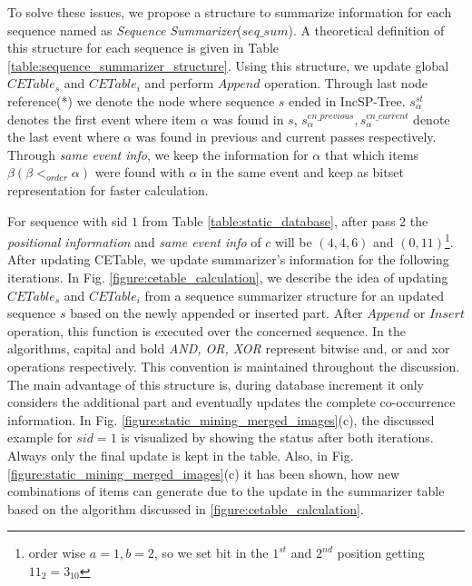 To solve these issues, we propose a structure to summarize information for each sequence named as \textit{Sequence Summarizer}($seq\_sum$). A theoretical definition of this structure for each sequence is given in Table \ref{table:sequence_summarizer_structure}. Using this structure, we update global $CETable_{s}$ and $CETable_{i}$ and perform $Append$ operation. Through last node reference(*) we denote the node where sequence $s$ ended in IncSP-Tree. $s_{\alpha}^{st}$ denotes the first event where item $\alpha$ was found in $s$, $s_{\alpha}^{en\_previous},s_{\alpha}^{en\_current}$ denote the last event where $\alpha$ was found in previous and current passes respectively. Through \textit{same event info}, we keep the information for $\alpha$ that which items $\beta(\beta <_{order} \alpha)$ were found with $\alpha$ in the same event and keep as bitset representation for faster calculation.

For sequence with sid $1$ from Table \ref{table:static_database}, after pass 2 the \textit{positional information} and \textit{same event info} of $c$ will be $(4,4,6)$ and $(0,11)$\footnote{order wise $a=1,b=2$, so we set bit in the $1^{st}$ and $2^{nd}$ position getting $11_{2}=3_{10}$}. After updating CETable, we update summarizer's information for the following iterations. In Fig. \ref{figure:cetable_calculation}, we describe the idea of updating $CETable_{s}$ and $CETable_{i}$ from a sequence summarizer structure for an updated sequence $s$ based on the newly appended or inserted part. After $Append$ or $Insert$ operation, this function is executed over the concerned sequence. In the algorithms, capital and bold \textit{AND, OR, XOR} represent bitwise and, or and xor operations respectively. This convention is maintained throughout the discussion. The main advantage of this structure is, during database increment it only considers the additional part and eventually updates the complete co-occurrence information. In Fig. \ref{figure:static_mining_merged_images}(c), the discussed example for $sid=1$ is visualized by showing the status after both iterations. Always only the final update is kept in the table. Also, in Fig. \ref{figure:static_mining_merged_images}(c) it has been shown, how new combinations of items can generate due to the update in the summarizer table based on the algorithm discussed in \ref{figure:cetable_calculation}.


